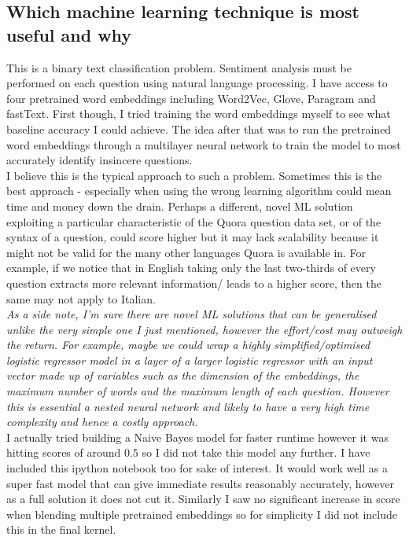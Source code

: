 \documentclass{article}
\begin{document}
\subsection{Which machine learning technique is most useful and why}

This is a binary text classification problem. Sentiment analysis must be performed on each question using natural language processing. I have access to four pretrained word embeddings including Word2Vec, Glove, Paragram and fastText. First though, I tried training the word embeddings myself to see what baseline accuracy I could achieve. The idea after that was to run the pretrained word embeddings through a multilayer neural network to train the model to most accurately identify insincere questions.\\

I believe this is the typical approach to such a problem. Sometimes this is the best approach - especially when using the wrong learning algorithm could mean time and money down the drain. Perhaps a different, novel ML solution exploiting a particular characteristic of the Quora question data set, or of the syntax of a question, could score higher but it may lack scalability because it might not be valid for the many other languages Quora is available in. For example, if we notice that in English taking only the last two-thirds of every question extracts more relevant information/ leads to a higher score, then the same may not apply to Italian.\\

\textit{As a side note, I'm sure there are novel ML solutions that can be generalised unlike the very simple one I just mentioned, however the effort/cost may outweigh the return. For example, maybe we could wrap a highly simplified/optimised logistic regressor model in a layer of a larger logistic regressor with an input vector made up of variables such as the dimension of the embeddings, the maximum number of words and the maximum length of each question. However this is essential a nested neural network and likely to have a very high time complexity and hence a costly approach.}\\

I actually tried building a Naive Bayes model for faster runtime however it was hitting scores of around 0.5 so I did not take this model any further. I have included this ipython notebook too for sake of interest. It would work well as a super fast model that can give immediate results reasonably accurately, however as a full solution it does not cut it. Similarly I saw no significant increase in score when blending multiple pretrained embeddings so for simplicity I did not include this in the final kernel.
\end{document}
